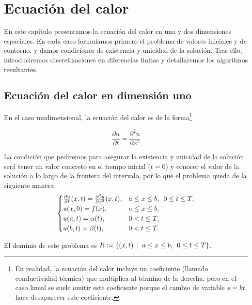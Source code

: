 \chapter{Ecuación del calor}
\label{cap:heat}
\begin{resumen}
	En este capítulo presentamos la ecuación del calor en una y dos dimensiones espaciales.
	En cada caso formulamos primero el problema de valores iniciales y de contorno, y damos condiciones de existencia y unicidad de la solución. Tras ello, introduciremos discretizaciones en diferencias finitas y detallaremos los algoritmos resultantes.
\end{resumen}

\section{Ecuación del calor en dimensión uno}
En el caso unidimensional, la ecuación del calor es de la forma\footnote{En realidad, la ecuación del calor incluye un coeficiente (llamado conductividad térmica) que multiplica al término de la derecha, pero en el caso lineal se suele omitir este coeficiente porque el cambio de variable $s=kt$ hace desaparecer este coeficiente.} 

\begin{equation}
	\frac{\partial u}{\partial t} = \frac{\partial ^2u}{\partial x^2}
\end{equation}

La condición que pediremos para asegurar la existencia y unicidad de la solución será tener un valor concreto en el tiempo inicial ($t=0$) y conocer el valor de la solución a lo largo de la frontera del intervalo, por lo que el problema queda de la siguiente manera
\begin{equation}\label{eq:1dheat}
	\begin{cases} 
		\frac{\partial u}{\partial t}(x,t) = \frac{\partial ^2u}{\partial x^2}(x,t), & a\leq x\leq b, \hspace{5px} 0\leq t \leq T,\\
		u(x,0)=f(x), & a\leq x\leq b, \\
		u(a,t)=\alpha(t), & 0<t\leq T,\\
		u(b,t)=\beta(t), & 0<t\leq T.
	\end{cases}
\end{equation}


El dominio de este problema es $R:=\{(x,t)\hspace{5px}|\hspace{5px} a\leq x \leq b, \hspace{5px} 0\leq t \leq T\}$.
